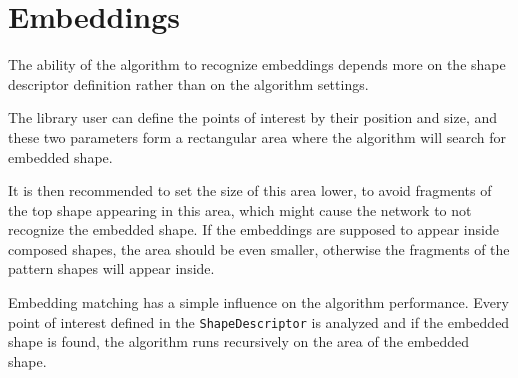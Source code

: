 \section{Embeddings}
The ability of the algorithm to recognize embeddings depends more on the shape descriptor definition rather than on the algorithm settings.

The library user can define the points of interest by their position and size, and these two parameters form a rectangular area where the algorithm will search for embedded shape.

It is then recommended to set the size of this area lower, to avoid fragments of the top shape appearing in this area, which might cause the network to not recognize the embedded shape. If the embeddings are supposed to appear inside composed shapes, the area should be even smaller, otherwise the fragments of the pattern shapes will appear inside.

Embedding matching has a simple influence on the algorithm performance. Every point of interest defined in the \texttt{ShapeDescriptor} is analyzed and if the embedded shape is found, the algorithm runs recursively on the area of the embedded shape.


